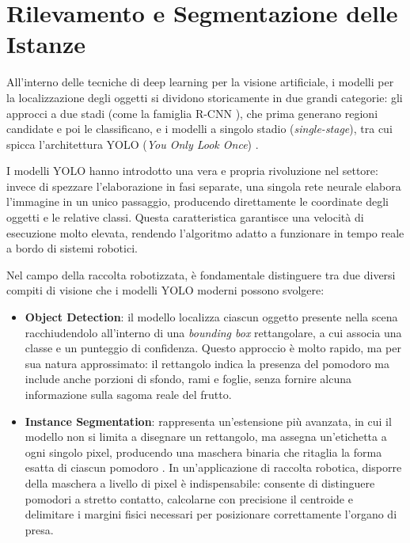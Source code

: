 \section{Rilevamento e Segmentazione delle Istanze}
\label{sec:detection_segmentation}

All'interno delle tecniche di deep learning per la visione artificiale, i modelli 
per la localizzazione degli oggetti si dividono storicamente in due grandi categorie: 
gli approcci a due stadi (come la famiglia R-CNN \cite{he2017mask}), che prima generano 
regioni candidate e poi le classificano, e i modelli a singolo stadio (\textit{single-stage}), 
tra cui spicca l'architettura YOLO (\textit{You Only Look Once}) \cite{redmon2016you}.

I modelli YOLO hanno introdotto una vera e propria rivoluzione nel settore: invece di 
spezzare l'elaborazione in fasi separate, una singola rete neurale elabora l'immagine 
in un unico passaggio, producendo direttamente le coordinate degli oggetti e le relative 
classi. Questa caratteristica garantisce una velocità di esecuzione molto elevata, 
rendendo l'algoritmo adatto a funzionare in tempo reale a bordo di sistemi robotici.

Nel campo della raccolta robotizzata, è fondamentale distinguere tra due diversi 
compiti di visione che i modelli YOLO moderni possono svolgere:
\begin{itemize}
    \item \textbf{Object Detection}: il modello localizza ciascun oggetto presente 
    nella scena racchiudendolo all'interno di una \textit{bounding box} rettangolare, 
    a cui associa una classe e un punteggio di confidenza. Questo approccio è molto rapido, 
    ma per sua natura approssimato: il rettangolo indica la presenza del pomodoro ma 
    include anche porzioni di sfondo, rami e foglie, senza fornire alcuna informazione 
    sulla sagoma reale del frutto.
    \item \textbf{Instance Segmentation}: rappresenta un'estensione più avanzata, in cui 
    il modello non si limita a disegnare un rettangolo, ma assegna un'etichetta a ogni 
    singolo pixel, producendo una maschera binaria che ritaglia la forma esatta di ciascun 
    pomodoro \cite{liu2020yolotomato}. In un'applicazione di raccolta robotica, disporre della 
    maschera a livello di pixel è indispensabile: consente di distinguere pomodori a stretto 
    contatto, calcolarne con precisione il centroide e delimitare i margini fisici necessari 
    per posizionare correttamente l'organo di presa.
\end{itemize}

